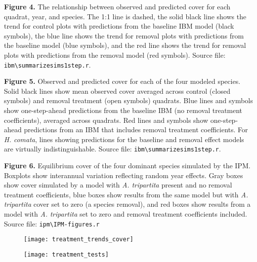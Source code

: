 \documentclass[11pt]{article}
\begin{document}
\begin{doublespacing}
\noindent \textbf{Figure 4.} The relationship between observed and predicted cover for each quadrat, year, and species. The 1:1 line is dashed, the solid black line shows the trend for control plots with predictions from the baseline IBM model (black symbols), the blue line shows the trend for removal plots with predictions from the baseline model (blue symbols), and the red line shows the trend for removal plots with predictions from the removal model (red symbols). Source file: \texttt{ibm\textbackslash summarize\textunderscore sims1step.r}. 

\vspace{3mm}
 
\noindent \textbf{Figure 5.} Observed and predicted cover for each of the four modeled species. Solid black lines show mean observed cover averaged across control (closed symbols) and removal treatment (open symbols) quadrats. Blue lines and symbols show one-step-ahead predictions from the baseline IBM (no removal treatment coefficients), averaged across quadrats. Red lines and symbols show one-step-ahead predictions from an IBM that includes removal treatment coefficients. For \textit{H. comata}, lines showing predictions for the baseline and removal effect models are virtually indistinguishable. Source file: \texttt{ibm\textbackslash summarize\textunderscore sims1step.r}. 

\vspace{3mm}
 
 \noindent\textbf{Figure 6.} Equilibrium cover of the four dominant species simulated by the IPM. Boxplots show interannual variation reflecting random year effects. Gray boxes show cover simulated by a model with \textit{A. tripartita} present and no removal treatment coefficients, blue boxes show results from the same model but with \textit{A. tripartita} cover set to zero (a species removal), and red boxes show results from a model with \textit{A. tripartita} set to zero and removal treatment coefficients included. Source file: \texttt{ipm\textbackslash IPM-figures.r}

\captionsetup[figure]{labelfont=bf, labelsep=none, justification=raggedright,singlelinecheck=false}

\clearpage
\begin{figure}[tbp]
\centering
\texttt{[image: treatment\_trends\_cover]}
\caption{}
\label{fig:CoverTrends}
\end{figure}

\clearpage
 \begin{figure}[tbp]
 \centering
 \texttt{[image: treatment\_tests]}
 \caption{}
 \label{fig:VitalRateTest}
 \end{figure}
 

\end{doublespacing}
\end{document}
